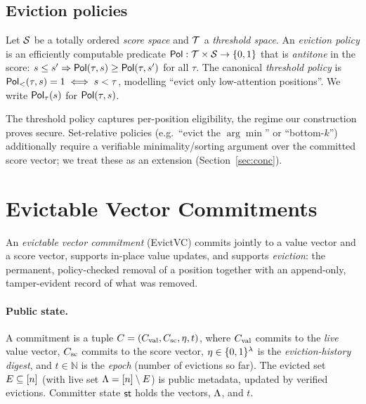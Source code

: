 \subsection{Eviction policies}

\begin{definition}\label{def:policy}
Let $\mathcal{S}$ be a totally ordered \emph{score space} and $\mathcal{T}$ a \emph{threshold
space}. An \emph{eviction policy} is an efficiently computable predicate
$\mathsf{Pol}:\mathcal{T}\times\mathcal{S}\to\{0,1\}$ that is \emph{antitone} in the score:
$s\le s'\Rightarrow\mathsf{Pol}(\tau,s)\ge\mathsf{Pol}(\tau,s')$ for all $\tau$. The canonical
\emph{threshold policy} is $\mathsf{Pol}_{<}(\tau,s)=1\iff s<\tau$, modelling ``evict
only low-attention positions''. We write $\mathsf{Pol}_\tau(s)$ for $\mathsf{Pol}(\tau,s)$.
\end{definition}

\begin{remark}
The threshold policy captures per-position eligibility, the regime our
construction proves secure. Set-relative policies (e.g.\ ``evict the $\arg\min$''
or ``bottom-$k$'') additionally require a verifiable minimality/sorting argument
over the committed score vector; we treat these as an extension
(Section~\ref{sec:conc}).
\end{remark}

\section{Evictable Vector Commitments}\label{sec:syntax}

An \emph{evictable vector commitment} (EvictVC) commits jointly to a value
vector and a score vector, supports in-place value updates, and supports
\emph{eviction}: the permanent, policy-checked removal of a position together
with an append-only, tamper-evident record of what was removed.

\paragraph{Public state.}
A commitment is a tuple $C=(C_{\mathrm{val}},C_{\mathrm{sc}},\eta,t)$, where $C_{\mathrm{val}}$ commits to the
\emph{live} value vector, $C_{\mathrm{sc}}$ commits to the score vector,
$\eta\in\{0,1\}^{\lambda}$ is the \emph{eviction-history digest}, and
$t\in\mathbb{N}$ is the \emph{epoch} (number of evictions so far). The evicted
set $E\subseteq[n]$ (with live set $\Lambda=[n]\setminus E$) is public
metadata, updated by verified evictions. Committer state $\mathsf{st}$ holds the
vectors, $\Lambda$, and $t$.

